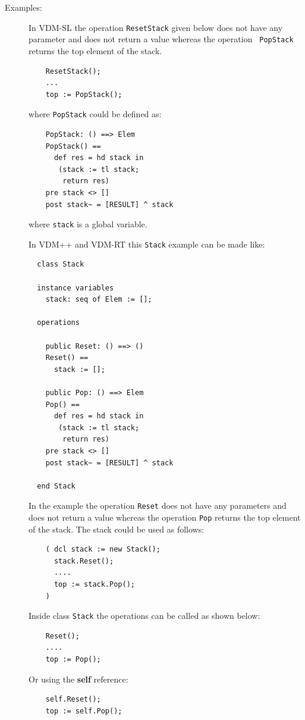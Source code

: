 \documentclass{overturerepchap}
\newcommand{\keyw}[1]{{\bf\ttfamily #1}}
\begin{document}
\begin{description}
\item[Examples:] \mbox{} 
  In VDM-SL the operation {\tt ResetStack} given below does not
  have any parameter and does not return a value whereas the operation {\tt
    PopStack} returns the top element of the stack.
  \begin{lstlisting}
    ResetStack();
    ...
    top := PopStack();
  \end{lstlisting}
  where {\tt PopStack} could be defined as:
  \begin{lstlisting}
    PopStack: () ==> Elem
    PopStack() ==
      def res = hd stack in
       (stack := tl stack;
        return res)
    pre stack <> []
    post stack~ = [RESULT] ^ stack
  \end{lstlisting}
  where {\tt stack} is a global variable.

  In VDM++ and VDM-RT this {\tt Stack} example can be made like:

  \begin{lstlisting}
  class Stack

  instance variables
    stack: seq of Elem := [];

  operations

    public Reset: () ==> ()
    Reset() ==
      stack := []; 

    public Pop: () ==> Elem
    Pop() ==
      def res = hd stack in
       (stack := tl stack;
        return res)
    pre stack <> []
    post stack~ = [RESULT] ^ stack

  end Stack
  \end{lstlisting}

  In the example the operation {\tt Reset} does not have any parameters
  and does not return a value whereas the operation {\tt Pop} returns
  the top element of the stack. The stack could be used as follows:
  \begin{lstlisting}
    ( dcl stack := new Stack();
      stack.Reset();
      ....
      top := stack.Pop();
    )
  \end{lstlisting}
 
  Inside class {\tt Stack} the operations can be called as shown below:   
  \begin{lstlisting}
    Reset();
    ....
    top := Pop();
  \end{lstlisting}
  
  Or using the \keyw{self} reference:
  \begin{lstlisting}
    self.Reset();
    top := self.Pop();
  \end{lstlisting}
\end{description}
\end{document}
